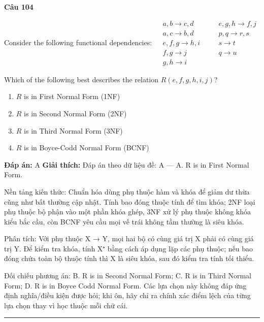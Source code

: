 \documentclass[11pt,a4paper]{article}
\newenvironment{question}[1]{%
  \par\vspace{1em}\noindent\textbf{\large Câu #1}\par\vspace{0.4em}
}{%
  \par\vspace{1em}\hrule\vspace{0.6em}
}
\newenvironment{choices}{%
  \begin{enumerate}[label=\textbf{\Alph*.},leftmargin=2.2em,itemsep=2pt,topsep=3pt]
}{%
  \end{enumerate}
}
\newcommand{\choice}{\item}
\begin{document}
\begin{question}{104}
Consider the following functional dependencies:
\(\begin{aligned}
&a, b \rightarrow c, d &\quad &e, g, h \rightarrow f, j \\
&a, c \rightarrow b, d &\quad &p, q \rightarrow r, s \\
&e, f, g \rightarrow h, i &\quad &s \rightarrow t \\
&f, g \rightarrow j &\quad &q \rightarrow u \\
&g, h \rightarrow i
\end{aligned}\)

Which of the following best describes the relation \(R(e, f, g, h, i, j)\)?
\begin{choices}
\choice \(R\) is in First Normal Form (1NF)
\choice \(R\) is in Second Normal Form (2NF)
\choice \(R\) is in Third Normal Form (3NF)
\choice \(R\) is in Boyce-Codd Normal Form (BCNF)
\end{choices}
\textbf{Đáp án:} A
\textbf{Giải thích:} Đáp án theo dữ liệu đề: A — A. R is in First Normal Form.

Nền tảng kiến thức: Chuẩn hóa dùng phụ thuộc hàm và khóa để giảm dư thừa cũng như bất thường cập nhật. Tính bao đóng thuộc tính để tìm khóa; 2NF loại phụ thuộc bộ phận vào một phần khóa ghép, 3NF xử lý phụ thuộc không khóa kiểu bắc cầu, còn BCNF yêu cầu mọi vế trái không tầm thường là siêu khóa.

Phân tích: Với phụ thuộc X → Y, mọi hai bộ có cùng giá trị X phải có cùng giá trị Y. Để kiểm tra khóa, tính X⁺ bằng cách áp dụng lặp các phụ thuộc; nếu bao đóng chứa toàn bộ thuộc tính thì X là siêu khóa, sau đó kiểm tra tính tối thiểu.

Đối chiếu phương án: B. R is in Second Normal Form; C. R is in Third Normal Form; D. R is in Boyce Codd Normal Form. Các lựa chọn này không đáp ứng định nghĩa/điều kiện được hỏi; khi ôn, hãy chỉ ra chính xác điểm lệch của từng lựa chọn thay vì học thuộc mỗi chữ cái.
\end{question}
\end{document}

